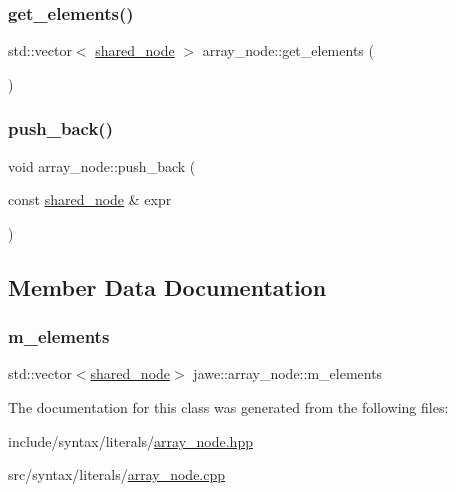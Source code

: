 \subsubsection{\texorpdfstring{get\+\_\+elements()}{get\_elements()}}
{\footnotesize\ttfamily std\+::vector$<$ \hyperlink{namespacejawe_a3f307481d921b6cbb50cc8511fc2b544}{shared\+\_\+node} $>$ array\+\_\+node\+::get\+\_\+elements (\begin{DoxyParamCaption}{ }\end{DoxyParamCaption})}

\mbox{\label{classjawe_1_1array__node_af7c5ff9f67cb6601195cbc738c097239}} 
\subsubsection{\texorpdfstring{push\+\_\+back()}{push\_back()}}
{\footnotesize\ttfamily void array\+\_\+node\+::push\+\_\+back (\begin{DoxyParamCaption}\item[{const \hyperlink{namespacejawe_a3f307481d921b6cbb50cc8511fc2b544}{shared\+\_\+node} \&}]{expr }\end{DoxyParamCaption})}



\subsection{Member Data Documentation}
\mbox{\label{classjawe_1_1array__node_a13e0825e1f6f7334678c6f8a313532c2}} 
\subsubsection{\texorpdfstring{m\+\_\+elements}{m\_elements}}
{\footnotesize\ttfamily std\+::vector$<$\hyperlink{namespacejawe_a3f307481d921b6cbb50cc8511fc2b544}{shared\+\_\+node}$>$ jawe\+::array\+\_\+node\+::m\+\_\+elements\hspace{0.3cm}{\ttfamily [private]}}



The documentation for this class was generated from the following files\+:\begin{DoxyCompactItemize}
\item 
include/syntax/literals/\hyperlink{array__node_8hpp}{array\+\_\+node.\+hpp}\item 
src/syntax/literals/\hyperlink{array__node_8cpp}{array\+\_\+node.\+cpp}\end{DoxyCompactItemize}
